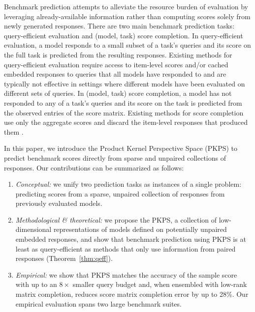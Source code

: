 \documentclass{article}
\theoremstyle{definition}
\theoremstyle{remark}
\theoremstyle{plain}
\newcommand{\PKPS}{PKPS\xspace}
\begin{document}
Benchmark prediction
attempts to alleviate the resource burden of evaluation by leveraging
already-available information rather than computing scores solely from newly generated
responses.
There are two main benchmark prediction tasks: query-efficient evaluation and
(model, task) score completion.
In query-efficient evaluation, a model responds to a small subset of a task's queries
and its score on the full task is predicted from the resulting responses.
Existing methods for query-efficient evaluation require access to item-level scores \citep{polo2024tinybenchmarks, hofmann2025fluid, li2024active,
bowyer2026efficient} and/or cached embedded responses \citep{dkps_qeff} to queries that all models have responded to and are typically not effective in settings where different models have been evaluated on different sets of queries.
In (model, task) score completion, a model has not responded to any of a task's
queries and its score on the task is predicted from the observed entries of the score
matrix.
Existing methods for score completion use only the aggregate scores and discard the
item-level responses that produced them \citep{benchpress}.

In this paper, we introduce the Product Kernel Perspective Space (\PKPS) to predict
benchmark scores directly from sparse and unpaired collections of responses.
Our contributions can be summarized as follows:
\begin{enumerate}
[wide, labelwidth=1pt, labelindent=12pt]
\setlength{\itemsep}{1pt}\setlength{\parskip}{0pt}
\item \emph{Conceptual:} we unify two prediction
tasks as instances
of a single problem: predicting scores from a sparse, unpaired collection of
responses from previously evaluated models.
\item \emph{Methodological \& theoretical:} we propose the \PKPS, a collection of
low-dimensional representations of models defined on potentially unpaired embedded
responses, and show that benchmark prediction using \PKPS is at least as
query-efficient as methods that only use information from paired responses
(Theorem~\ref{thm:qeff}).
\item \emph{Empirical:} we show
that \PKPS matches the accuracy of the sample score with up to an $8\times$ smaller
query budget and, when ensembled with low-rank matrix completion, reduces score
matrix completion error by up to 28\%. Our empirical evaluation spans two large benchmark suites. 
\end{enumerate}
\end{document}
